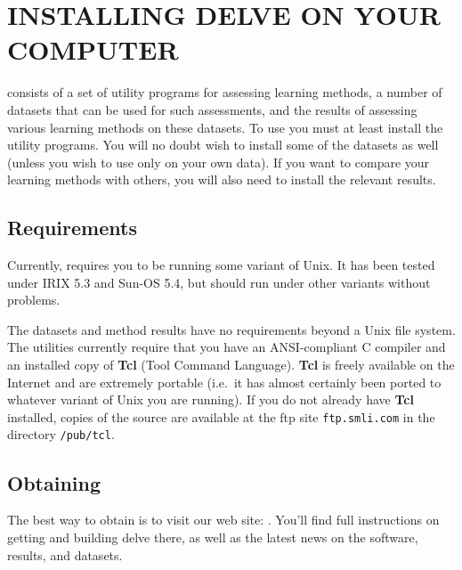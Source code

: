 %
%
\newpage

\section{INSTALLING DELVE ON YOUR COMPUTER}\label{app-install}
\thispagestyle{plain}
\setcounter{figure}{0}

\delve{} consists of a set of utility programs for assessing learning
methods, a number of datasets that can be used for such assessments,
and the results of assessing various learning methods on these
datasets.  To use \delve{} you must at least install the utility
programs.  You will no doubt wish to install some of the datasets as
well (unless you wish to use \delve{} only on your own data).  If you
want to compare your learning methods with others, you will also need
to install the relevant results.

\subsection*{Requirements}

Currently, \delve{} requires you to be running some variant of
Unix. It has been tested under IRIX 5.3 and Sun-OS 5.4, but should run
under other variants without problems.

The datasets and method results have no requirements beyond a Unix
file system.  The utilities currently require that you have an
ANSI-compliant C compiler and an installed copy of \textbf{Tcl} (Tool
Command Language).  \textbf{Tcl} is freely available on the Internet
and are extremely portable (i.e.~it has almost certainly been ported
to whatever variant of Unix you are running).  If you do not already
have \textbf{Tcl} installed, copies of the source are available at the
ftp site \texttt{ftp.smli.com} in the directory \texttt{/pub/tcl}.

\subsection*{Obtaining \delve}

The best way to obtain \delve{} is to visit our web site: \wwwhome{}.
You'll find full instructions on getting and building delve there, as
well as the latest news on the software, results, and datasets.

